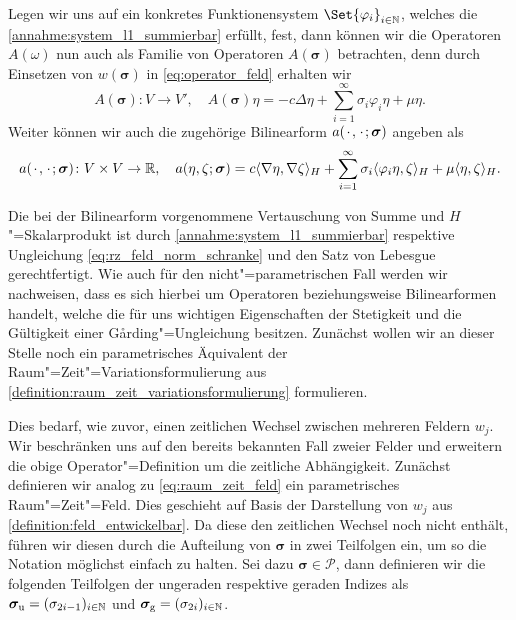 \documentclass[../main.tex]{subfiles}
\begin{document}
Legen wir uns auf ein konkretes Funktionensystem $\Set{\varphi_{i}}_{i \in \mathbb{N}}$, welches die \cref{annahme:system_l1_summierbar} erfüllt, fest, dann können wir die Operatoren $A(\omega)$ nun auch als Familie von Operatoren $A(\bm\sigma)$ betrachten, denn durch Einsetzen von $w(\bm\sigma)$ in \cref{eq:operator_feld} erhalten wir
\begin{equation}
\label{eq:operator_parameter}
    A(\bm\sigma) \colon V \to V', \quad A(\bm\sigma) \eta = -c \Delta \eta + \sum_{i = 1}^{\infty} \sigma_{i} \varphi_{i} \eta + \mu \eta.
\end{equation}
Weiter können wir auch die zugehörige Bilinearform $a({\mkern2mu\cdot\mkern2mu}, {\mkern2mu\cdot\mkern2mu}; \bm\sigma)$ angeben als
\begin{equation}
\label{eq:bilinearform_parameter}
    \begin{aligned}
    a({\mkern2mu\cdot\mkern2mu}, {\mkern2mu\cdot\mkern2mu}; \bm\sigma) \colon V \times V \to \mathbb{R},
    \quad a(\eta, \zeta; \bm\sigma) = c\langle\nabla \eta,\nabla \zeta\rangle_{H} + \sum_{i = 1}^{\infty} \sigma_{i} \langle\varphi_{i} \eta,\zeta\rangle_{H} + \mu \langle\eta,\zeta\rangle_{H}.
    \end{aligned}
\end{equation}

Die bei der Bilinearform vorgenommene Vertauschung von Summe und $H$"=Skalarprodukt ist durch \cref{annahme:system_l1_summierbar} respektive Ungleichung \cref{eq:rz_feld_norm_schranke} und den Satz von Lebesgue gerechtfertigt.
Wie auch für den nicht"=parametrischen Fall werden wir nachweisen, dass es sich hierbei um Operatoren beziehungsweise Bilinearformen handelt, welche die für uns wichtigen Eigenschaften der Stetigkeit und die Gültigkeit einer G\aa{}rding"=Ungleichung besitzen.
Zunächst wollen wir an dieser Stelle noch ein parametrisches Äquivalent der Raum"=Zeit"=Variationsformulierung aus \cref{definition:raum_zeit_variationsformulierung} formulieren.

Dies bedarf, wie zuvor, einen zeitlichen Wechsel zwischen mehreren Feldern $w_{j}$.
Wir beschränken uns auf den bereits bekannten Fall zweier Felder und erweitern die obige Operator"=Definition um die zeitliche Abhängigkeit.
Zunächst definieren wir analog zu \cref{eq:raum_zeit_feld} ein parametrisches Raum"=Zeit"=Feld.
Dies geschieht auf Basis der Darstellung von $w_{j}$ aus \cref{definition:feld_entwickelbar}.
Da diese den zeitlichen Wechsel noch nicht enthält, führen wir diesen durch die Aufteilung von $\bm \sigma$ in zwei Teilfolgen ein, um so die Notation möglichst einfach zu halten.
Sei dazu $\bm\sigma \in \mathcal P$, dann definieren wir die folgenden Teilfolgen der ungeraden respektive geraden Indizes als $\bm\sigma_{\text{u}} = (\sigma_{2i-1})_{i \in \mathbb{N}}$ und $\bm\sigma_{\text{g}} = (\sigma_{2i})_{i \in \mathbb{N}}$.
\end{document}
